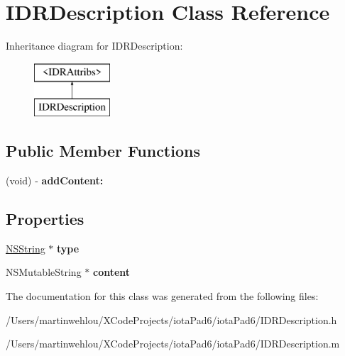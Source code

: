 \hypertarget{interface_i_d_r_description}{
\section{IDRDescription Class Reference}
\label{interface_i_d_r_description}
}
Inheritance diagram for IDRDescription:\begin{figure}[H]
\begin{center}
\leavevmode
\includegraphics[height=2.000000cm]{interface_i_d_r_description}
\end{center}
\end{figure}
\subsection*{Public Member Functions}
\begin{DoxyCompactItemize}
\item 
\hypertarget{interface_i_d_r_description_ad057d18b7ea13a9bed58b7af2aec528c}{
(void) -\/ {\bfseries addContent:}}
\label{interface_i_d_r_description_ad057d18b7ea13a9bed58b7af2aec528c}

\end{DoxyCompactItemize}
\subsection*{Properties}
\begin{DoxyCompactItemize}
\item 
\hypertarget{interface_i_d_r_description_a3da416c110d310b3529fcfa6def4aacc}{
\hyperlink{class_n_s_string}{NSString} $\ast$ {\bfseries type}}
\label{interface_i_d_r_description_a3da416c110d310b3529fcfa6def4aacc}

\item 
\hypertarget{interface_i_d_r_description_a9fa48e426adf6de1880c9bb0b2900fb8}{
NSMutableString $\ast$ {\bfseries content}}
\label{interface_i_d_r_description_a9fa48e426adf6de1880c9bb0b2900fb8}

\end{DoxyCompactItemize}


The documentation for this class was generated from the following files:\begin{DoxyCompactItemize}
\item 
/Users/martinwehlou/XCodeProjects/iotaPad6/iotaPad6/IDRDescription.h\item 
/Users/martinwehlou/XCodeProjects/iotaPad6/iotaPad6/IDRDescription.m\end{DoxyCompactItemize}
